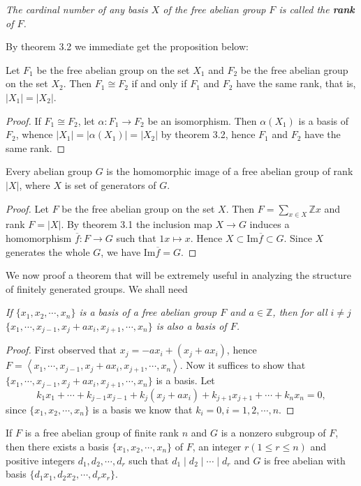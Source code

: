 \begin{note}\em
The cardinal number of any basis $X$ of the free abelian group $F$ is called the \textbf{rank} of $F$.
\end{note}
By theorem 3.2 we immediate get the proposition below:
\begin{proposition}
Let $F_1$ be the free abelian group on the set $X_1$ and $F_2$ be the free abelian group on the set $X_2$. Then $F_1\cong F_2$ if and only if $F_1$ and $F_2$ have the same rank, that is, $|X_1|=|X_2|$.
\end{proposition}
\begin{proof}
If $F_1\cong F_2$, let $\alpha:F_1\to F_2$ be an isomorphism. Then $\alpha(X_1)$ is a basis of $F_2$, whence $|X_1|=|\alpha(X_1)|=|X_2|$ by theorem 3.2, hence $F_1$ and $F_2$ have the same rank.
\end{proof}
\begin{theorem}
Every abelian group $G$ is the homomorphic image of a free abelian group of rank $|X|$, where $X$ is set of generators of $G$.
\end{theorem}
\begin{proof}
Let $F$ be the free abelian group on the set $X$. Then $F=\sum_{x\in X}\mathbb{Z}x$ and rank $F=|X|$. By theorem 3.1 the inclusion map $X\to G$ induces a homomorphism $\overline{f}:F\to G$ such that $1x\mapsto x$. Hence $X\subset\mathrm{Im}\overline{f}\subset G$. Since $X$ generates the whole $G$, we have $\mathrm{Im}\overline{f}=G$.
\end{proof}
We now proof a theorem that will be extremely useful in analyzing the structure of finitely generated groups. We shall need 
\begin{lemma}\em
If $\{x_1,x_2,\cdots,x_n\}$ is a basis of a free abelian group $F$ and $a\in\mathbb{Z}$, then for all $i\ne j$ $\{x_1,\cdots,x_{j-1},x_j+ax_i,x_{j+1},\cdots,x_n\}$ is also a basis of $F$.
\end{lemma}
\begin{proof}
First observed that $x_j=-ax_i+(x_j+ax_i)$, hence $F=\left<x_1,\cdots,x_{j-1},x_j+ax_i,x_{j+1},\cdots,x_n\right>$. Now it suffices to show that $\{x_1,\cdots,x_{j-1},x_j+ax_i,x_{j+1},\cdots,x_n\}$ is a basis. Let
$$
k_1x_1+\cdots +k_{j-1}x_{j-1}+k_j\left( x_j+ax_i \right) +k_{j+1}x_{j+1}+\cdots +k_nx_n=0,
$$
since $\{x_1,x_2,\cdots,x_n\}$ is a basis we know that $k_i=0,i=1,2,\cdots,n$.
\end{proof}
\begin{theorem}
If $F$ is a free abelian group of finite rank $n$ and $G$ is a nonzero subgroup of $F$, then there exists a basis $\{x_1,x_2,\cdots,x_n\}$ of $F$, an integer $r(1\le r\le n)$ and positive integers $d_1,d_2,\cdots,d_r$ such that $d_1\mid d_2\mid\cdots\mid d_r$ and $G$ is free abelian with basis $\{d_1x_1,d_2x_2,\cdots,d_rx_r\}$. 
\end{theorem}
